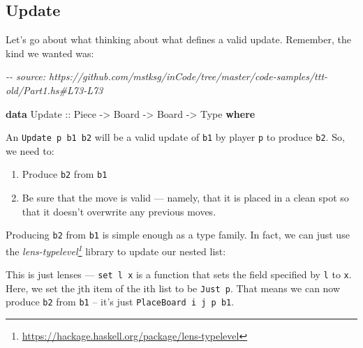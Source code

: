 \documentclass[]{article}
\newenvironment{Shaded}{}{}
\newcommand{\CommentTok}[1]{\textcolor[rgb]{0.38,0.63,0.69}{\textit{#1}}}
\newcommand{\DataTypeTok}[1]{\textcolor[rgb]{0.56,0.13,0.00}{#1}}
\newcommand{\KeywordTok}[1]{\textcolor[rgb]{0.00,0.44,0.13}{\textbf{#1}}}
\newcommand{\NormalTok}[1]{#1}
\newcommand{\OperatorTok}[1]{\textcolor[rgb]{0.40,0.40,0.40}{#1}}
\newcommand{\OtherTok}[1]{\textcolor[rgb]{0.00,0.44,0.13}{#1}}
\renewcommand{\href}[2]{#2\footnote{\url{#1}}}
\begin{document}
\subsection{Update}\label{update}

Let's go about what thinking about what defines a valid update. Remember, the
kind we wanted was:

\begin{Shaded}
\begin{Highlighting}[]
\CommentTok{{-}{-} source: https://github.com/mstksg/inCode/tree/master/code{-}samples/ttt{-}old/Part1.hs\#L73{-}L73}

\KeywordTok{data} \DataTypeTok{Update}\OtherTok{ ::} \DataTypeTok{Piece} \OtherTok{{-}\textgreater{}} \DataTypeTok{Board} \OtherTok{{-}\textgreater{}} \DataTypeTok{Board} \OtherTok{{-}\textgreater{}} \DataTypeTok{Type} \KeywordTok{where}
\end{Highlighting}
\end{Shaded}

An \texttt{Update\ p\ b1\ b2} will be a valid update of \texttt{b1} by player
\texttt{p} to produce \texttt{b2}. So, we need to:

\begin{enumerate}
\def\labelenumi{\arabic{enumi}.}
\tightlist
\item
  Produce \texttt{b2} from \texttt{b1}
\item
  Be sure that the move is valid --- namely, that it is placed in a clean spot
  so that it doesn't overwrite any previous moves.
\end{enumerate}

Producing \texttt{b2} from \texttt{b1} is simple enough as a type family. In
fact, we can just use the
\emph{\href{https://hackage.haskell.org/package/lens-typelevel}{lens-typelevel}}
library to update our nested list:

\begin{Shaded}
\end{Shaded}

This is just lenses --- \texttt{set\ l\ x} is a function that sets the field
specified by \texttt{l} to \texttt{x}. Here, we set the jth item of the ith list
to be \texttt{Just\ p}. That means we can now produce \texttt{b2} from
\texttt{b1} -- it's just \texttt{PlaceBoard\ i\ j\ p\ b1}.
\end{document}
